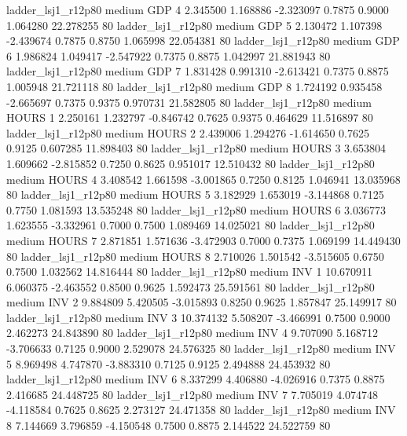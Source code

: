     ladder_lsj1_r12p80     medium      GDP                 4  2.345500 1.168886 -2.323097 0.7875 0.9000  1.064280   22.278255 80
    ladder_lsj1_r12p80     medium      GDP                 5  2.130472 1.107398 -2.439674 0.7875 0.8750  1.065998   22.054381 80
    ladder_lsj1_r12p80     medium      GDP                 6  1.986824 1.049417 -2.547922 0.7375 0.8875  1.042997   21.881943 80
    ladder_lsj1_r12p80     medium      GDP                 7  1.831428 0.991310 -2.613421 0.7375 0.8875  1.005948   21.721118 80
    ladder_lsj1_r12p80     medium      GDP                 8  1.724192 0.935458 -2.665697 0.7375 0.9375  0.970731   21.582805 80
    ladder_lsj1_r12p80     medium    HOURS                 1  2.250161 1.232797 -0.846742 0.7625 0.9375  0.464629   11.516897 80
    ladder_lsj1_r12p80     medium    HOURS                 2  2.439006 1.294276 -1.614650 0.7625 0.9125  0.607285   11.898403 80
    ladder_lsj1_r12p80     medium    HOURS                 3  3.653804 1.609662 -2.815852 0.7250 0.8625  0.951017   12.510432 80
    ladder_lsj1_r12p80     medium    HOURS                 4  3.408542 1.661598 -3.001865 0.7250 0.8125  1.046941   13.035968 80
    ladder_lsj1_r12p80     medium    HOURS                 5  3.182929 1.653019 -3.144868 0.7125 0.7750  1.081593   13.535248 80
    ladder_lsj1_r12p80     medium    HOURS                 6  3.036773 1.623555 -3.332961 0.7000 0.7500  1.089469   14.025021 80
    ladder_lsj1_r12p80     medium    HOURS                 7  2.871851 1.571636 -3.472903 0.7000 0.7375  1.069199   14.449430 80
    ladder_lsj1_r12p80     medium    HOURS                 8  2.710026 1.501542 -3.515605 0.6750 0.7500  1.032562   14.816444 80
    ladder_lsj1_r12p80     medium      INV                 1 10.670911 6.060375 -2.463552 0.8500 0.9625  1.592473   25.591561 80
    ladder_lsj1_r12p80     medium      INV                 2  9.884809 5.420505 -3.015893 0.8250 0.9625  1.857847   25.149917 80
    ladder_lsj1_r12p80     medium      INV                 3 10.374132 5.508207 -3.466991 0.7500 0.9000  2.462273   24.843890 80
    ladder_lsj1_r12p80     medium      INV                 4  9.707090 5.168712 -3.706633 0.7125 0.9000  2.529078   24.576325 80
    ladder_lsj1_r12p80     medium      INV                 5  8.969498 4.747870 -3.883310 0.7125 0.9125  2.494888   24.453932 80
    ladder_lsj1_r12p80     medium      INV                 6  8.337299 4.406880 -4.026916 0.7375 0.8875  2.416685   24.448725 80
    ladder_lsj1_r12p80     medium      INV                 7  7.705019 4.074748 -4.118584 0.7625 0.8625  2.273127   24.471358 80
    ladder_lsj1_r12p80     medium      INV                 8  7.144669 3.796859 -4.150548 0.7500 0.8875  2.144522   24.522759 80
